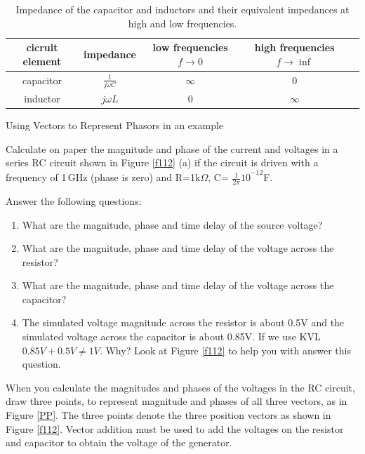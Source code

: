 \documentclass{ximera}
\begin{document}
\begin{table}
\centering
\begin{tabular}{|c|c|c|c|c|} \hline
cicruit element & impedance & low frequencies $f \to 0$& high frequencies $f \to \inf$   \\  \hline  
 capacitor     & $\frac{1}{j \omega C}$    & $\infty$ & $0$    \\  \hline       
 inductor & $j \omega L$              &    $0$   &       $\infty $             \\ \hline
\end{tabular}
\caption{Impedance of the capacitor and inductors and their equivalent impedances at high and low frequencies.}
\end{table}



\begin{example}
Using Vectors to Represent Phasors in an example


 Calculate on paper the magnitude  and phase of the current and voltages in a series RC circuit shown in Figure \ref{f112} (a) if the circuit is driven with a frequency of 1\,GHz (phase is zero) and R=1k$\Omega $, C= ${\frac{1}{2\pi }10}^{-12}$F. 
 
 
 Answer the following questions:

\begin{enumerate}
\item  What are the magnitude, phase and time delay of the source voltage?

\item  What are the magnitude, phase and time delay of the voltage across the resistor?

\item  What are the magnitude, phase and time delay of the voltage across the capacitor?

\item  The simulated voltage magnitude across the resistor is about 0.5V and the simulated voltage across the capacitor is about 0.85V.  If we use KVL $ 0.85V+0.5V \neq 1V$. Why? Look at Figure \ref{f112} to help you with answer this question.

\end{enumerate}
\begin{explanation} 
 
 
  When you calculate the magnitudes and phases of the voltages in the RC circuit, draw three points, to represent magnitude and phases of all three vectors, as in Figure \ref{PP}. The three points denote the three position vectors as shown in Figure \ref{f112}. Vector addition must be used to add the voltages on the resistor and capacitor to obtain the voltage of the generator. 







\end{explanation}
\end{example}
\end{document}

